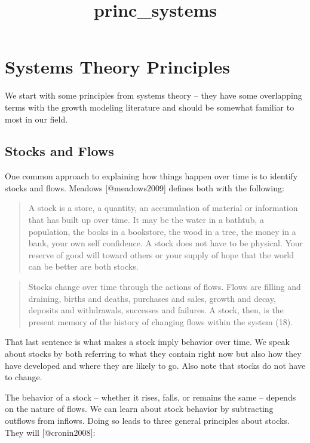 \documentclass[]{article}
\title{princ\_systems}
\author{}
\date{}
\begin{document}
\maketitle

\hypertarget{systems-theory-principles}{%
\section{Systems Theory Principles}\label{systems-theory-principles}}

We start with some principles from systems theory -- they have some
overlapping terms with the growth modeling literature and should be
somewhat familiar to most in our field.

\hypertarget{stocks-and-flows}{%
\subsection{Stocks and Flows}\label{stocks-and-flows}}

One common approach to explaining how things happen over time is to
identify stocks and flows. Meadows {[}@meadows2009{]} defines both with
the following:

\begin{quote}
A stock is a store, a quantity, an accumulation of material or
information that has built up over time. It may be the water in a
bathtub, a population, the books in a bookstore, the wood in a tree, the
money in a bank, your own self confidence. A stock does not have to be
physical. Your reserve of good will toward others or your supply of hope
that the world can be better are both stocks.
\end{quote}

\begin{quote}
Stocks change over time through the actions of flows. Flows are filling
and draining, births and deaths, purchases and sales, growth and decay,
deposits and withdrawals, successes and failures. A stock, then, is the
present memory of the history of changing flows within the system (18).
\end{quote}

\noindent That last sentence is what makes a stock imply behavior over
time. We speak about stocks by both referring to what they contain right
now but also how they have developed and where they are likely to go.
Also note that stocks do not have to change.

The behavior of a stock -- whether it rises, falls, or remains the same
-- depends on the nature of flows. We can learn about stock behavior by
subtracting outflows from inflows. Doing so leads to three general
principles about stocks. They will {[}@cronin2008{]}:
\end{document}
